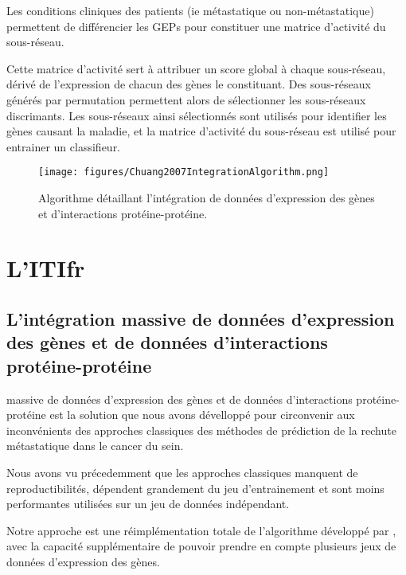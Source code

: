       Les conditions cliniques des patients (ie métastatique ou non-métastatique) permettent de différencier les \acp{GEP} pour constituer une matrice d'activité du sous-réseau.

      Cette matrice d'activité sert à attribuer un score global à chaque sous-réseau, dérivé de l'expression de chacun des gènes le constituant.
      Des sous-réseaux générés par permutation permettent alors de sélectionner les sous-réseaux discrimants.
      Les sous-réseaux ainsi sélectionnés sont utilisés pour identifier les gènes causant la maladie, et la matrice d'activité du sous-réseau est utilisé pour entrainer un classifieur.

      \begin{figure}
        \centering
        \texttt{[image: figures/Chuang2007IntegrationAlgorithm.png]}
        \caption{Algorithme détaillant l'intégration de données d'expression des gènes et d'interactions protéine-protéine\citep{Chuang2007}.}
        \label{fig:Chuang2007IntegrationAlgorithm}
      \end{figure}
    

  \section{\textcolor{mygreen}{L'\acl{ITIfr}}}

    \subsection{\textcolor{mygreen}{L'intégration massive de données d'expression des gènes et de données d'interactions protéine-protéine}}

       massive de données d'expression des gènes et de données d'interactions protéine-protéine est la solution que nous avons dévelloppé pour circonvenir aux inconvénients des approches classiques des méthodes de prédiction de la rechute métastatique dans le cancer du sein.

      Nous avons vu précedemment que les approches classiques manquent de reproductibilités, dépendent grandement du jeu d'entrainement et sont moins performantes utilisées sur un jeu de données indépendant.

      Notre approche est une réimplémentation totale de l'algorithme développé par \citeauthor{Chuang2007}, avec la capacité supplémentaire de pouvoir prendre en compte plusieurs jeux de données d'expression des gènes.

